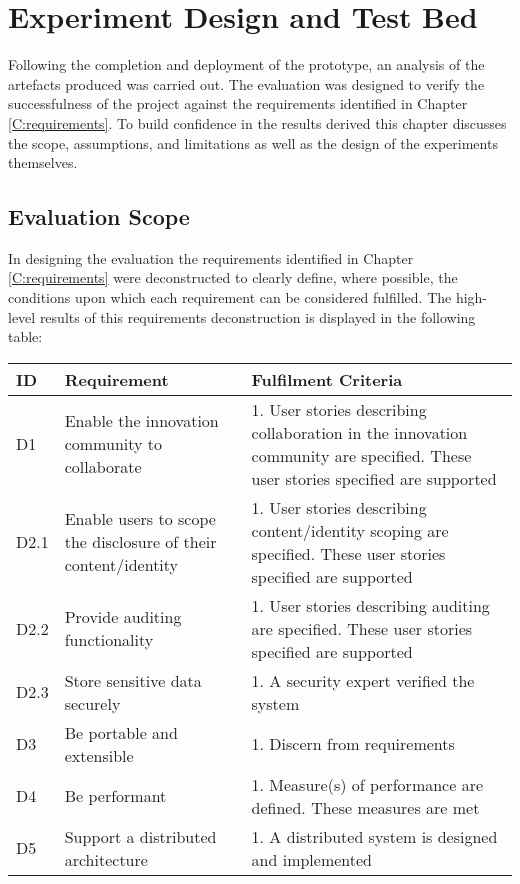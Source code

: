 \chapter{Experiment Design and Test Bed}
Following the completion and deployment of the prototype, an analysis of the artefacts produced was carried out. The evaluation was designed to verify the successfulness of the project against the requirements identified in Chapter \ref{C:requirements}. To build confidence in the results derived this chapter discusses the scope, assumptions, and limitations as well as the design of the experiments themselves.

\section{Evaluation Scope}\label{S:evaluationScope}
In designing the evaluation the requirements identified in Chapter \ref{C:requirements} were deconstructed to clearly define, where possible, the conditions upon which each requirement can be considered fulfilled. The high-level results of this requirements deconstruction is displayed in the following table:

\begin{adjustwidth}{-1.25cm}{}
\begin{tabular}{ |p{1cm}||p{6cm}|p{10cm}|  }
 \hline
 ID & Requirement & Fulfilment Criteria\\
 \hline
    D1 & Enable the innovation community to collaborate & 1. User stories describing collaboration in the innovation 
  community are specified\newline2. These user stories specified are supported\\
 \hline
    D2.1 & Enable users to scope the disclosure of their content/identity & 1. User stories describing content/identity scoping are specified\newline2. These user stories specified are supported\\
 \hline
    D2.2 & Provide auditing functionality & 1. User stories describing auditing are specified\newline2. These user stories specified are supported\\
 \hline
    D2.3 & Store sensitive data securely & 1. A security expert verified the system\\
 \hline
    D3 & Be portable and extensible & 1. Discern from requirements\\
 \hline
    D4 & Be performant & 1. Measure(s) of performance are defined\newline2. These measures are met\\
 \hline
    D5 & Support a distributed architecture & 1. A distributed system is designed and implemented\\
 \hline
\end{tabular}
\end{adjustwidth}
\vspace{1em}

